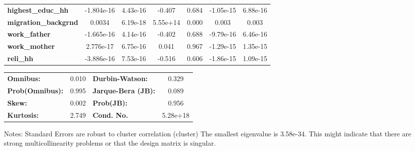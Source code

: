 \begin{center}
\begin{tabular}{lcccccc}
\textbf{highest\_educ\_hh}               &   -1.804e-16  &     4.43e-16     &    -0.407  &         0.684        &    -1.05e-15    &     6.88e-16     \\
\textbf{migration\_backgrnd}             &       0.0034  &     6.19e-18     &  5.55e+14  &         0.000        &        0.003    &        0.003     \\
\textbf{work\_father}                    &   -1.665e-16  &     4.14e-16     &    -0.402  &         0.688        &    -9.79e-16    &     6.46e-16     \\
\textbf{work\_mother}                    &    2.776e-17  &     6.75e-16     &     0.041  &         0.967        &    -1.29e-15    &     1.35e-15     \\
\textbf{reli\_hh}                        &   -3.886e-16  &     7.53e-16     &    -0.516  &         0.606        &    -1.86e-15    &     1.09e-15     \\
\bottomrule
\end{tabular}
\begin{tabular}{lclc}
\textbf{Omnibus:}       &  0.010 & \textbf{  Durbin-Watson:     } &    0.329  \\
\textbf{Prob(Omnibus):} &  0.995 & \textbf{  Jarque-Bera (JB):  } &    0.089  \\
\textbf{Skew:}          &  0.002 & \textbf{  Prob(JB):          } &    0.956  \\
\textbf{Kurtosis:}      &  2.749 & \textbf{  Cond. No.          } & 5.28e+18  \\
\bottomrule
\end{tabular}
\end{center}

Notes: \newline
 [1] Standard Errors are robust to cluster correlation (cluster) \newline
 [2] The smallest eigenvalue is 3.58e-34. This might indicate that there are \newline
 strong multicollinearity problems or that the design matrix is singular.
